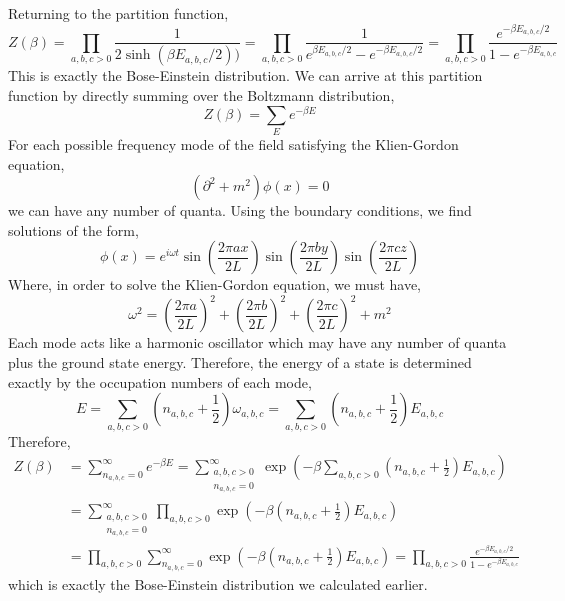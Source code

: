 \documentclass[12pt]{article}
\begin{document}
Returning to the partition function,
\[ Z(\beta) = \prod\limits_{a,b,c > 0} \frac{1}{2 \sinh{(\beta E_{a,b,c}/2))}} = \prod\limits_{a,b,c > 0} \frac{1}{e^{\beta E_{a,b,c} / 2} - e^{- \beta E_{a,b,c} /2 }} = \prod\limits_{a,b,c > 0} \frac{e^{- \beta E_{a,b,c} /2 }}{1 - e^{- \beta E_{a,b,c} }}  \]
This is exactly the Bose-Einstein distribution. We can arrive at this partition function by directly summing over the Boltzmann distribution,
\[ Z(\beta) = \sum_{E} e^{- \beta E} \]  
For each possible frequency mode of the field satisfying the Klien-Gordon equation,
\[ (\partial^2 + m^2) \phi(x) = 0 \]
we can have any number of quanta. Using the boundary conditions, we find solutions of the form,
\[ \phi(x) = e^{i \omega t} \sin{\left( \frac{2\pi a x}{2L} \right)} \sin{\left( \frac{2\pi b y}{2L} \right)} \sin{\left( \frac{2\pi c z}{2L} \right)} \]
Where, in order to solve the Klien-Gordon equation, we must have,
\[ \omega^2 = \left( \frac{2\pi a}{2L} \right)^2  + \left( \frac{2\pi b}{2L} \right)^2  + \left( \frac{2\pi c}{2L} \right)^2  + m^2 \]
Each mode acts like a harmonic oscillator which may have any number of quanta plus the ground state energy. Therefore, the energy of a state is determined exactly by the occupation numbers of each mode,
\[ E = \sum_{a,b,c > 0} \left( n_{a,b,c} + \frac{1}{2} \right) \omega_{a,b,c} = \sum_{a,b,c > 0} \left( n_{a,b,c} + \frac{1}{2} \right) E_{a,b,c} \] 
Therefore,
\begin{align*} Z(\beta) & = \sum_{n_{a,b,c} = 0}^\infty e^{- \beta E} =  \sum_{\substack{a,b,c>0 \\ n_{a,b,c} = 0}}^\infty \exp{\left( - \beta \sum_{a,b,c > 0} \left( n_{a,b,c} + \frac{1}{2} \right) E_{a,b,c}  \right)} 
\\
& = \sum_{\substack{a,b,c>0 \\ n_{a,b,c} = 0}}^\infty  \prod_{a,b,c > 0} \exp{\left( - \beta \left( n_{a,b,c} + \frac{1}{2} \right) E_{a,b,c}  \right)} 
\\
& = \prod_{a,b,c > 0} \sum_{n_{a,b,c} = 0}^\infty  \exp{\left( - \beta \left( n_{a,b,c} + \frac{1}{2} \right) E_{a,b,c}  \right)}  = \prod_{a,b,c > 0} \frac{e^{-\beta E_{a,b,c}/2}}{1 - e^{-\beta E_{a,b,c}}} 
\end{align*}
which is exactly the Bose-Einstein distribution we calculated earlier. 
\end{document}
